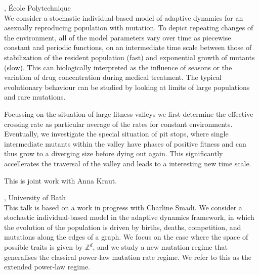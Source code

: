 \documentclass[12pt,a4paper]{article}
\begin{document}
\bigskip\bigskip

, École Polytechnique \\[2ex] We consider a stochastic individual-based model of adaptive dynamics for an asexually reproducing population with mutation. To depict repeating changes of the environment, all of the model parameters vary over time as piecewise constant and periodic functions, on an intermediate time scale between those of stabilization of the resident population (fast) and exponential growth of mutants (slow). This can biologically interpreted as the influence of seasons or the variation of drug concentration during medical treatment. The typical evolutionary behaviour can be studied by looking at limits of large populations and rare mutations. 

 Focussing on the situation of large fitness valleys we first determine the effective crossing rate as particular average of the rates for constant environments. Eventually, we investigate the special situation of pit stops, where single intermediate mutants within the valley have phases of positive fitness and can thus grow to a diverging size before dying out again. This significantly accellerates the traversal of the valley and leads to a interesting new time scale. 

 This is joint work with Anna Kraut. 

\bigskip\bigskip

, University of Bath \\[2ex] This talk is based on a work in progress with Charline Smadi. We consider a stochastic individual-based model in the adaptive dynamics framework, in which the evolution of the population is driven by births, deaths, competition, and mutations along the edges of a graph. We focus on the case where the space of possible traits is given by $\mathbb{Z}^d$, and we study a new mutation regime that generalises the classical power-law mutation rate regime. We refer to this as the extended power-law regime. 
\end{document}
